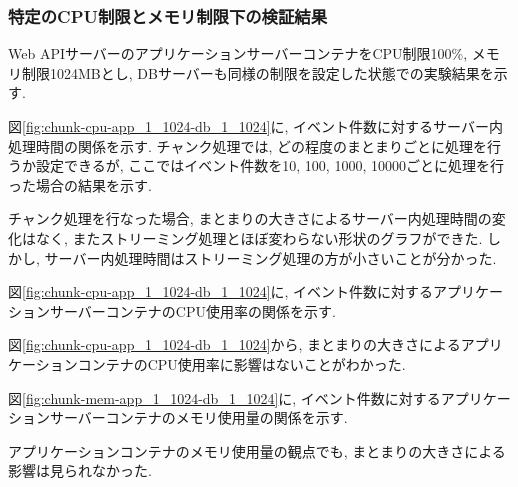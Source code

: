\documentclass[../../../../main]{subfiles}
\begin{document}
    \subsubsection{特定のCPU制限とメモリ制限下の検証結果}\label{subsubsec:result-chunk-only-limit}

    Web APIサーバーのアプリケーションサーバーコンテナをCPU制限100\%, メモリ制限1024MBとし, DBサーバーも同様の制限を設定した状態での実験結果を示す.

    \label{subsubsubsec:result-chunk-only-limit-server-time}

    図\ref{fig:chunk-cpu-app_1_1024-db_1_1024}に, イベント件数に対するサーバー内処理時間の関係を示す. チャンク処理では, どの程度のまとまりごとに処理を行うか設定できるが, ここではイベント件数を10, 100, 1000, 10000ごとに処理を行った場合の結果を示す.

    

    チャンク処理を行なった場合, まとまりの大きさによるサーバー内処理時間の変化はなく, またストリーミング処理とほぼ変わらない形状のグラフができた. しかし, サーバー内処理時間はストリーミング処理の方が小さいことが分かった.

    \label{subsubsubsec:result-chunk-only-limit-server-cpu}

    図\ref{fig:chunk-cpu-app_1_1024-db_1_1024}に, イベント件数に対するアプリケーションサーバーコンテナのCPU使用率の関係を示す.

    

    図\ref{fig:chunk-cpu-app_1_1024-db_1_1024}から, まとまりの大きさによるアプリケーションコンテナのCPU使用率に影響はないことがわかった.

    \label{subsubsubsec:result-chunk-only-limit-server-memory}

    図\ref{fig:chunk-mem-app_1_1024-db_1_1024}に, イベント件数に対するアプリケーションサーバーコンテナのメモリ使用量の関係を示す.

    

    アプリケーションコンテナのメモリ使用量の観点でも, まとまりの大きさによる影響は見られなかった.
\end{document}
